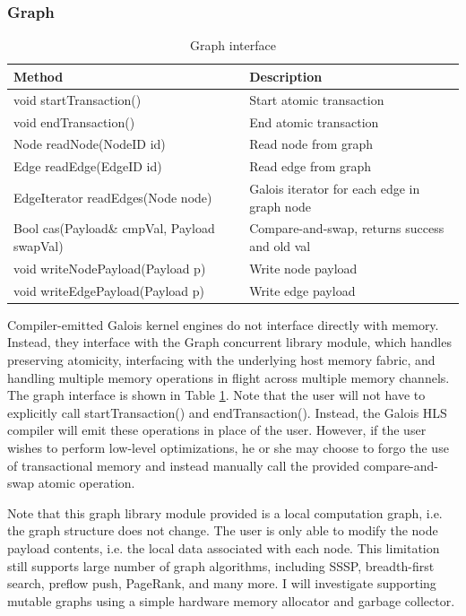 \subsubsection{Graph}

\begin{table}
\begin{tabular}{ | l | l | }
  \hline
  \textbf{Method} & \textbf{Description} \\
  \hline
  void startTransaction() & Start atomic transaction \\
  \hline
  void endTransaction() & End atomic transaction \\
  \hline
  Node readNode(NodeID id) & Read node from graph \\
  \hline
  Edge readEdge(EdgeID id) & Read edge from graph \\
  \hline
  EdgeIterator readEdges(Node node) & Galois iterator for each edge in graph node\\
  \hline
  Bool cas(Payload\& cmpVal, Payload swapVal) & Compare-and-swap, returns success and old val\\
  \hline
  void writeNodePayload(Payload p) & Write node payload \\
  \hline
  void writeEdgePayload(Payload p) & Write edge payload \\
  \hline
\end{tabular}
\caption{Graph interface}
\label{table:graph}
\end{table}

Compiler-emitted Galois kernel engines do not interface directly with memory. Instead, they interface with the Graph 
concurrent library module, which handles preserving atomicity, interfacing with the underlying host memory fabric, and 
handling multiple memory operations in flight across multiple memory channels. The graph interface is shown in Table 
\ref{table:graph}. Note that the user will not have to explicitly call startTransaction() and endTransaction(). 
Instead, the Galois HLS compiler will emit these operations in place of the user. However, if the user wishes to 
perform low-level optimizations, he or she may choose to forgo the use of transactional memory and instead manually 
call the provided compare-and-swap atomic operation.

Note that this graph library module provided is a local computation graph, i.e. the graph structure does not change. 
The user is only able to modify the node payload contents, i.e. the local data associated with each node. This 
limitation still supports large number of graph algorithms, including SSSP, breadth-first search, preflow push, 
PageRank, and many more. I will investigate supporting mutable graphs using a simple hardware memory allocator and 
garbage collector.

